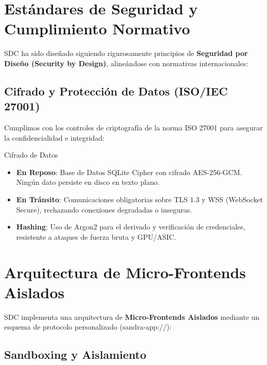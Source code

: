 
\section{Estándares de Seguridad y Cumplimiento Normativo}

SDC ha sido diseñado siguiendo rigurosamente principios de \textbf{Seguridad por Diseño (Security by Design)}, alineándose con normativas internacionales:

\subsection{Cifrado y Protección de Datos (ISO/IEC 27001)}

Cumplimos con los controles de criptografía de la norma ISO 27001 para asegurar la confidencialidad e integridad:

\begin{caja}{Cifrado de Datos}
\begin{itemize}
\item \textbf{En Reposo}: Base de Datos SQLite Cipher con cifrado AES-256-GCM. Ningún dato persiste en disco en texto plano.
\item \textbf{En Tránsito}: Comunicaciones obligatorias sobre TLS 1.3 y WSS (WebSocket Secure), rechazando conexiones degradadas o inseguras.
\item \textbf{Hashing}: Uso de Argon2 para el derivado y verificación de credenciales, resistente a ataques de fuerza bruta y GPU/ASIC.
\end{itemize}
\end{caja}


\section{Arquitectura de Micro-Frontends Aislados}

SDC implementa una arquitectura de \textbf{Micro-Frontends Aislados} mediante un esquema de protocolo personalizado (sandra-app://):

\subsection{Sandboxing y Aislamiento}

